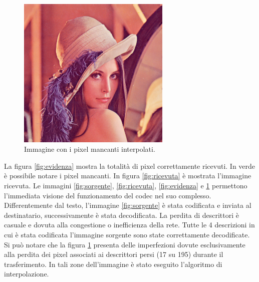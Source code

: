 \begin{figure}[ht]
\centering \includegraphics[width=0.65\textwidth]{../images/lena4.png}
	\caption{Immagine con i pixel mancanti interpolati.}
	\label{fig:interpolata}
\end{figure}

La figura \ref{fig:evidenza} mostra la totalità di pixel correttamente
ricevuti. In verde è possibile notare i pixel mancanti.
In figura \ref{fig:ricevuta} è mostrata l'immagine ricevuta.
Le immagini \ref{fig:sorgente}, \ref{fig:ricevuta}, \ref{fig:evidenza} e
\ref{fig:interpolata} permettono l'immediata visione del funzionamento del codec
nel suo complesso. Differentemente dal testo, l'immagine \ref{fig:sorgente} è stata codificata e inviata al destinatario, successivamente è stata decodificata. La
perdita di descrittori è casuale e dovuta alla congestione o
inefficienza della rete. Tutte le 4 descrizioni in cui è stata codificata
l'immagine sorgente sono state correttamente decodificate.
Si può notare che la figura \ref{fig:interpolata} presenta delle imperfezioni
dovute esclusivamente alla perdita dei pixel associati ai descrittori persi (17 su 195) durante il trasferimento. In tali zone
dell'immagine è stato eseguito l'algoritmo di interpolazione. 